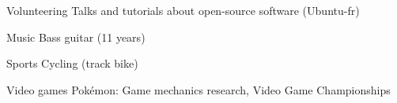 


\begin{cvskills}
	
	\cvskill
	{Volunteering} %
	{Talks and tutorials about open-source software (Ubuntu-fr)} %
	
	
	\cvskill
	{Music} %
	{Bass guitar (11 years)} %
	
	
	\cvskill
	{Sports} %
	{Cycling (track bike)} %
	
	
	\cvskill
	{Video games} %
	{Pokémon: Game mechanics research, Video Game Championships} %
	
\end{cvskills}
